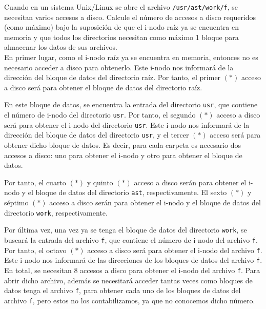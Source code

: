 \begin{ejercicio}
Cuando en un sistema Unix/Linux se abre el archivo \verb|/usr/ast/work/f|,
se necesitan varios accesos a disco. Calcule el número de accesos a disco requeridos
(como máximo) bajo la suposición de que el i-nodo raíz ya se encuentra en memoria y que
todos los directorios necesitan como máximo 1 bloque para almacenar los datos de sus archivos.\\

En primer lugar, como el i-nodo raíz ya se encuentra en memoria, entonces no es necesario
acceder a disco para obtenerlo. Este i-nodo nos informará de la dirección del bloque
de datos del directorio raíz. Por tanto, el primer $(\ast)$ acceso a disco será
para obtener el bloque de datos del directorio raíz.

En este bloque de datos,
se encuentra la entrada del directorio \verb|usr|, que contiene el número de i-nodo
del directorio \verb|usr|. Por tanto, el segundo $(\ast)$ acceso a disco será para
obtener el i-nodo del directorio \verb|usr|. Este i-nodo nos informará de la dirección
del bloque de datos del directorio \verb|usr|, y el tercer $(\ast)$ acceso será para
obtener dicho bloque de datos. Es decir, para cada carpeta es necesario
dos accesos a disco: uno para obtener el i-nodo y otro para obtener el bloque de datos.

Por tanto, el cuarto $(\ast)$ y quinto $(\ast)$ acceso a disco serán para obtener el i-nodo
y el bloque de datos del directorio \verb|ast|, respectivamente. El sexto $(\ast)$ y séptimo $(\ast)$
acceso a disco serán para obtener el i-nodo y el bloque de datos del directorio \verb|work|,
respectivamente.

Por última vez, una vez ya se tenga el bloque de datos del directorio \verb|work|,
se buscará la entrada del archivo \verb|f|, que contiene el número de i-nodo del archivo \verb|f|.
Por tanto, el octavo $(\ast)$ acceso a disco será para obtener el i-nodo del archivo \verb|f|.
Este i-nodo nos informará de las direcciones de los bloques de datos del archivo \verb|f|.\\

En total, se necesitan $8$ accesos a disco para obtener el i-nodo del archivo \verb|f|.
Para abrir dicho archivo, además se necesitará acceder tantas veces como bloques de datos
tenga el archivo \verb|f|, para obtener cada uno de los bloques de datos del archivo \verb|f|, pero
estos no los contabilizamos, ya que no conocemos dicho número.
\end{ejercicio}

